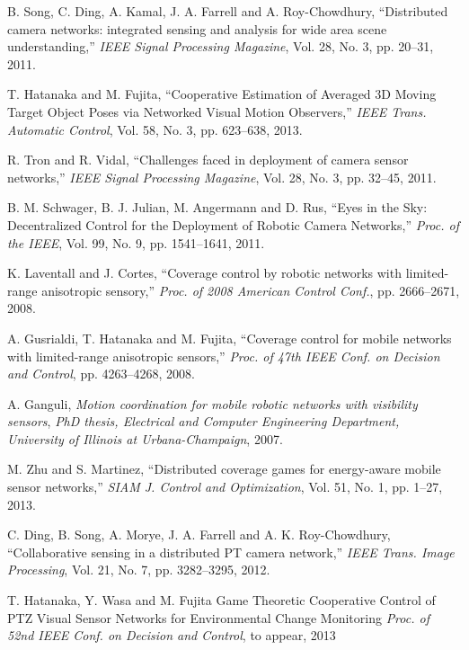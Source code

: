 \documentclass[conference,letterpaper]{ieeeconf}
\begin{document}
\begin{thebibliography}{99}




B. Song, C. Ding, A. Kamal, J. A. Farrell and A. Roy-Chowdhury,
``Distributed camera networks: integrated sensing and analysis for wide
area scene understanding,'' {\it IEEE Signal Processing Magazine}, Vol. 28,
No. 3, pp. 20--31, 2011.

T. Hatanaka and M. Fujita,
``Cooperative Estimation of Averaged 3D Moving Target Object Poses via Networked Visual Motion Observers,'' 
{\it IEEE Trans. Automatic Control}, Vol. 58, No. 3, pp. 623--638, 2013.



R. Tron and R. Vidal,
``Challenges faced in deployment of camera sensor networks,''
{\it IEEE Signal Processing Magazine}, Vol. 28, No. 3, pp. 32--45, 2011.


B. M. Schwager, B. J. Julian, M. Angermann and D. Rus,
``Eyes in the Sky: Decentralized
Control for the Deployment of Robotic Camera Networks,''
{\it Proc. of the IEEE}, Vol. 99, No. 9, pp. 1541--1641, 2011.


K. Laventall and J. Cortes,
``Coverage control by robotic networks with limited-range anisotropic sensory,''
{\it Proc. of 2008 American Control Conf.}, pp. 2666--2671, 2008.

A. Gusrialdi, T. Hatanaka and M. Fujita,
``Coverage control for mobile networks with limited-range anisotropic sensors,''
{\it Proc. of 47th IEEE Conf. on Decision and Control}, pp. 4263--4268, 2008.

A. Ganguli, {\it Motion coordination for mobile robotic networks with visibility sensors}, 
{\it PhD thesis, Electrical and Computer Engineering Department, University of Illinois at Urbana-Champaign}, 2007.


M. Zhu and S. Martinez,
``Distributed coverage games for energy-aware mobile sensor networks,''
{\it SIAM J. Control and Optimization}, Vol. 51, No. 1, pp. 1--27, 2013.


C. Ding, B. Song, A. Morye, J. A. Farrell and A. K. Roy-Chowdhury,
``Collaborative sensing in a distributed PT camera network,''
{\it IEEE Trans. Image Processing}, Vol. 21, No. 7, pp. 3282--3295, 2012.



T. Hatanaka, Y. Wasa and M. Fujita
Game Theoretic Cooperative Control of PTZ Visual Sensor Networks for Environmental Change Monitoring
{\it Proc. of 52nd IEEE Conf. on Decision and Control}, to appear, 2013






\end{thebibliography}
\end{document}
